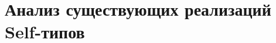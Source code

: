 \section{Анализ существующих реализаций Self-типов} \label{sec:impls}

%
%

%
%
%
%
%
%
%
%
%
%
%
%
%
%
%
%
%
%
%
%
%
%
%
%
%
%
%
%
%
%
%
%
%
%
